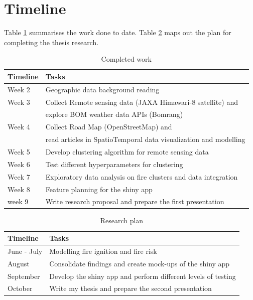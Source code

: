 \documentclass[11pt,a4paper,]{article}
\begin{document}
\hypertarget{timeline}{%
\section{Timeline}\label{timeline}}

Table \ref{tab:timeline1} summarises the work done to date. Table \ref{tab:timeline2} maps out the plan for completing the thesis research.

\begin{table}

\caption{\label{tab:timeline1}Completed work}
\centering
\begin{tabular}[t]{ll}
\toprule
Timeline & Tasks\\
\midrule
Week 2 & Geographic data background reading\\
Week 3 & Collect Remote sensing data (JAXA Himawari-8 satellite) and\\
 & explore BOM weather data APIs (Bomrang)\\
Week 4 & Collect Road Map (OpenStreetMap) and\\
 & read articles in SpatioTemporal data visualization and modelling\\
\addlinespace
Week 5 & Develop clustering algorithm for remote sensing data\\
Week 6 & Test different hyperparameters for clustering\\
Week 7 & Exploratory data analysis on fire clusters and data integration\\
Week 8 & Feature planning for the shiny app\\
week 9 & Write research proposal and prepare the first presentation\\
\bottomrule
\end{tabular}
\end{table}

\begin{table}

\caption{\label{tab:timeline2}Research plan}
\centering
\begin{tabular}[t]{ll}
\toprule
Timeline & Tasks\\
\midrule
June - July & Modelling fire ignition and fire risk\\
August & Consolidate findings and create mock-ups of the shiny app\\
September & Develop the shiny app and perform different levels of testing\\
October & Write my thesis and prepare the second presentation\\
\bottomrule
\end{tabular}
\end{table}
\end{document}
